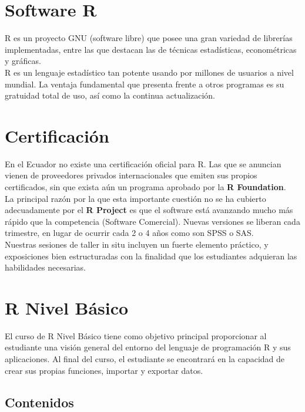 \documentclass[11pt,a4paper,oneside]{article}\usepackage[]{graphicx}\usepackage[]{color}
\begin{document}
\section{Software R}

R es un proyecto GNU (software libre) que posee una gran variedad de librerías implementadas, entre las que destacan las de técnicas estadísticas, econométricas y gráficas.\\

R es un lenguaje estadístico tan potente usando por millones de usuarios a nivel mundial. La ventaja fundamental que presenta frente a otros programas es su gratuidad total de uso, así como la continua actualización.

\section{Certificación}

En el Ecuador no existe una certificación oficial para R. Las que se anuncian vienen de proveedores privados internacionales que emiten sus propios certificados, sin que exista aún un programa aprobado por la {\bf R Foundation}.\\

La principal razón por la que esta importante cuestión no se ha cubierto adecuadamente por el {\bf R Project} es que el software está avanzando mucho más rápido que la competencia (Software Comercial). Nuevas versiones se liberan cada trimestre, en lugar de ocurrir cada 2 o 4 años como son SPSS o SAS.\\

Nuestras sesiones de taller in situ incluyen un fuerte elemento práctico, y exposiciones bien estructuradas con la finalidad que los estudiantes adquieran las habilidades necesarias.
  
\section{R Nivel Básico}

El curso de R Nivel Básico tiene como objetivo principal proporcionar al estudiante una visión general del entorno del lenguaje de programación R y sus aplicaciones. Al final del curso, el estudiante se encontrará en la capacidad de crear sus propias funciones, importar y exportar datos.

\subsection{Contenidos}
\end{document}

